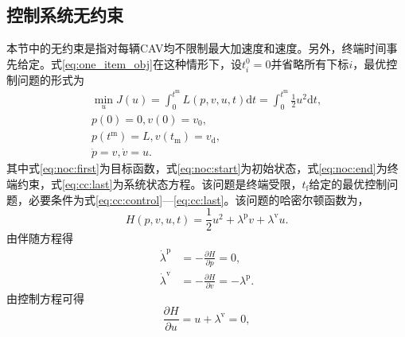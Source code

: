 \subsection{控制系统无约束}
\label{ssec:noc}
本节中的无约束是指对每辆CAV均不限制最大加速度和速度。另外，终端时间事先给定。式\eqref{eq:one_item_obj}在这种情形下，设$t_i^{0}=0$并省略所有下标$i$，最优控制问题的形式为
\begin{gather}
\min_{u} J(u)=\int_{0}^{t^\mathrm{m}}L(p,v,u,t)\mathrm{d}t=\int_{0}^{t^\mathrm{m}}\frac12 u^2\mathrm{d}t,\label{eq:noc:first}\\
p(0)=0, v(0)=v_0,\label{eq:noc:start}\\
p(t^\mathrm{m})=L, v(t_\mathrm{m})=v_\mathrm{d},\label{eq:noc:end}\\
\dot{p}=v, \dot{v}=u. \label{eq:noc:last}
\end{gather}
其中式\eqref{eq:noc:first}为目标函数，式\eqref{eq:noc:start}为初始状态，式\eqref{eq:noc:end}为终端约束，式\eqref{eq:cc:last}为系统状态方程。该问题是终端受限，$t_\mathrm{f}$给定的最优控制问题，必要条件为式\eqref{eq:cc:control}---\eqref{eq:cc:last}。该问题的哈密尔顿函数为，
\begin{equation}
H(p,v,u,t)=\frac12 u^2+\lambda^\mathrm{p}v + \lambda^\mathrm{v}u.
\end{equation}
由伴随方程得
\begin{align}
\dot{\lambda}^\mathrm{p}&=-\frac{\partial H}{\partial p}=0, \label{eq:dlp}\\
\dot{\lambda}^\mathrm{v}&=-\frac{\partial H}{\partial v}=-\lambda^\mathrm{p}. \label{eq:dlv}
\end{align}
由控制方程可得
\begin{equation}
\frac{\partial H}{\partial u}=u+\lambda^\mathrm{v}=0,
\label{eq:uwrtlv}
\end{equation}

